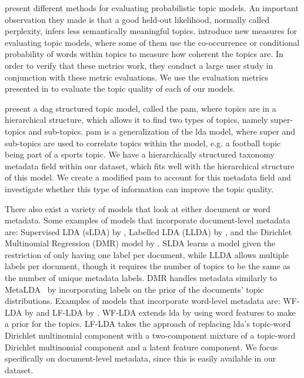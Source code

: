 \citet{tea_leaves} present different methods for evaluating probabilistic topic models. 
An important observation they made is that a good held-out likelihood, normally called perplexity, infers less semantically meaningful topics.
\citet{topic_coherence_2015} introduce new measures for evaluating topic models, where some of them use the co-occurrence or conditional probability of words within topics to measure how coherent the topics are. 
In order to verify that these metrics work, they conduct a large user study in conjunction with these metric evaluations.
We use the evaluation metrics presented in \citet{topic_coherence_2015} to evaluate the topic quality of each of our models.

\citet{li2006pachinko} present a \gls{dag} structured topic model, called the \acrfull{pam}, where topics are in a hierarchical structure, which allows it to find two types of topics, namely super-topics and sub-topics. 
\Gls{pam} is a generalization of the \gls{lda} model, where super and sub-topics are used to correlate topics within the model, e.g. a football topic being part of a sports topic.
We have a hierarchically structured taxonomy metadata field within our dataset, which fits well with the hierarchical structure of this model.
We create a modified \gls{pam} to account for this metadata field and investigate whether this type of information can improve the topic quality.

There also exist a variety of models that look at either document or word metadata.
Some examples of models that incorporate document-level metadata are: Supervised LDA (sLDA) by \citet{blei2010supervised}, Labelled LDA (LLDA) by \citet{llda2009}, and the Dirichlet Multinomial Regression (DMR) model by \citet{mimno2008topic}.
SLDA learns a model given the restriction of only having one label per document, while LLDA allows multiple labels per document, though it requires the number of topics to be the same as the number of unique metadata labels.
DMR handles metadata similarly to MetaLDA~\cite{MetaLDA2017} by incorporating labels on the prior of the documents' topic distributions.
Examples of models that incorporate word-level metadata are: WF-LDA by \citet{wf-lda2010} and LF-LDA by \citet{lf-lda2015}.
WF-LDA extends \gls{lda} by using word features to make a prior for the topics.
LF-LDA takes the approach of replacing \gls{lda}'s topic-word Dirichlet multinomial component with a two-component mixture of a topic-word Dirichlet multinomial component and a latent feature component.
We focus specifically on document-level metadata, since this is easily available in our dataset.

